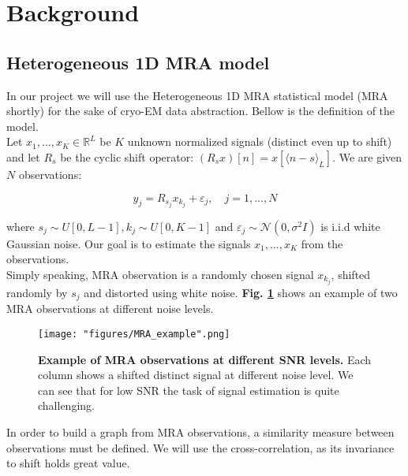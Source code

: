 \center

\section{Background}

\raggedright

\subsection{Heterogeneous 1D \acrlong{MRA} model}

In our project we will use the Heterogeneous 1D \acrlong{MRA} statistical model\cite{boumal2018heterogeneous} (\acrshort{MRA} shortly) for the sake of \acrshort{cryo-EM} data abstraction. Bellow is the definition of the model.\\
Let $x_1,...,x_K \in \mathbb{R}^L$ be $K$ unknown normalized signals (distinct even up to shift) and let $R_s$ be the cyclic shift operator: $(R_sx)[n]=x[\langle n-s \rangle_L]$. We are given $N$ observations:

\begin{equation}
\label{eqn:MRA_obs}
y_j = R_{s_j} x_{k_j} + \varepsilon_j, \quad j=1,...,N
\end{equation}

where $s_j \sim U[0, L-1],k_j \sim U[0, K-1]$ and $\varepsilon_j \sim \mathcal{N}(0,\sigma^2I)$ is i.i.d white Gaussian noise. Our goal is to estimate the signals 
$x_1,...,x_K$ from the observations.\\
Simply speaking, \acrshort{MRA} observation is a randomly chosen signal $x_{k_j}$, shifted randomly by $s_j$ and distorted using white noise. \textbf{Fig.  \ref{fig:MRA_exmp}} shows an example of two \acrshort{MRA} observations at different noise levels.

\begin{figure}[h]
  \centering
  \texttt{[image: "figures/MRA\_example".png]}
  \caption{\textbf{Example of \acrshort{MRA} observations at different SNR levels.} Each column shows a shifted distinct signal at different noise level. We can see that for low \acrshort{SNR} the task of signal estimation is quite challenging.}
  \label{fig:MRA_exmp}
\end{figure}

In order to build a graph from \acrshort{MRA} observations, a similarity measure between observations must be defined. We will use the cross-correlation, as its invariance to shift holds great value.

